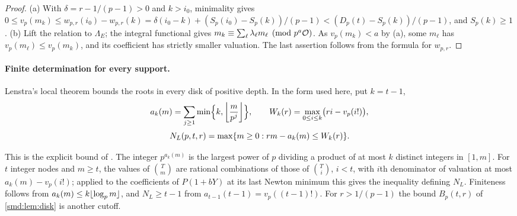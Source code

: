\begin{proof}
(a) With $\delta=r-1/(p-1)>0$ and $k>i_0$, minimality gives
$0\le v_p(m_k)\le w_{p,r}(i_0)-w_{p,r}(k)=\delta(i_0-k)+(S_p(i_0)-S_p(k))/(p-1)
<(D_p(t)-S_p(k))/(p-1)$, and $S_p(k)\ge1$. (b) Lift the relation to $\Lambda_E$; the integral
functional gives $m_k\equiv\sum_\ell\lambda_\ell m_\ell\pmod{p^a\OO}$. As $v_p(m_k)<a$ by (a),
some $m_\ell$ has $v_p(m_\ell)\le v_p(m_k)$, and its coefficient has strictly smaller
valuation. The last assertion follows from the formula for $w_{p,r}$.
\end{proof}

\paragraph{Finite determination for every support.}
Lenstra's local theorem bounds the roots in every disk of positive depth. In the form used
here, put $k=t-1$,
\[
 a_k(m)=\sum_{j\ge1}\min\Bigl\{k,\floor*{\frac m{p^j}}\Bigr\},\qquad
 W_k(r)=\max_{0\le i\le k}\bigl(ri-v_p(i!)\bigr),
\]
\[
 N_L(p,t,r)=\max\set{m\ge0 : rm-a_k(m)\le W_k(r)} .
\]


This is the explicit bound of \cite[\S3]{Lenstra1999Factorization}. The integer $p^{a_k(m)}$ is
the largest power of $p$ dividing a product of at most $k$ distinct integers in $[1,m]$. For
$t$ integer nodes and $m\ge t$, the values of $\binom Tm$ are rational combinations of those of
$\binom Ti$, $i<t$, with $i$th denominator of valuation at most $a_k(m)-v_p(i!)$; applied to
the coefficients of $P(1+bY)$ at its last Newton minimum this gives the inequality defining
$N_L$. Finiteness follows from $a_k(m)\le k\floor{\log_pm}$, and $N_L\ge t-1$ from
$a_{t-1}(t-1)=v_p((t-1)!)$. For $r>1/(p-1)$ the bound $B_p(t,r)$ of \cref{smd:lem:disk} is
another cutoff.

